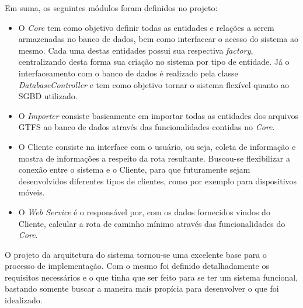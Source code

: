 Em suma, os seguintes módulos foram definidos no projeto:
\begin{itemize}
	\item O \emph{Core} tem como objetivo definir todas as entidades e relações a serem armazenadas no banco de dados, bem como interfacear o acesso do sistema ao mesmo.
			Cada uma destas entidades possui sua respectiva \emph{factory}, centralizando desta forma sua criação no sistema por tipo de entidade.
			Já o interfaceamento com o banco de dados é realizado pela classe \emph{DatabaseController} e tem como objetivo tornar o sistema flexível quanto ao SGBD utilizado.

	\item O \emph{Importer} consiste basicamente em importar todas as entidades dos arquivos GTFS ao banco de dados através das funcionalidades contidas no \emph{Core}.
	\item O Cliente consiste na interface com o usuário, ou seja, coleta de informação e mostra de informações a respeito da rota resultante.
	Buscou-se flexibilizar a conexão entre o sistema e o Cliente, para que futuramente sejam desenvolvidos diferentes tipos de clientes, como por exemplo para dispositivos móveis.
	\item O \emph{Web Service} é o responsável por, com os dados fornecidos vindos do Cliente, calcular a rota de caminho mínimo através das funcionalidades do \emph{Core}.
\end{itemize}

O projeto da arquitetura do sistema tornou-se uma excelente base para o processo de implementação.
Com o mesmo foi definido detalhadamente os requisitos necessários e o que tinha que ser feito para se ter um sistema funcional, bastando somente buscar a maneira mais propícia para desenvolver o que foi idealizado.